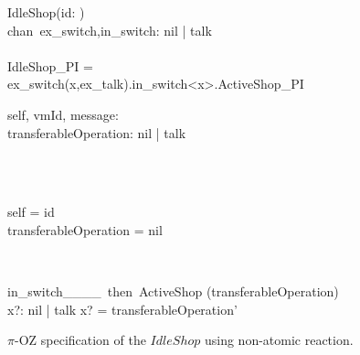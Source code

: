 \begin{figure}[H]
\centering
\begin{class}{IdleShop(id: \integer)}
\ 
\\chan\ ex\_switch,in\_switch: nil | talk
\ \\ \
\\IdleShop\_PI = 
\\ \qquad  ex\_switch(x,ex\_talk).in\_switch<x>.ActiveShop\_PI
\\
\begin{state}
self, vmId, message: \integer
\\transferableOperation: nil | talk
\end{state} 
\\
\begin{init}
\\self = id
\\transferableOperation = nil
\end{init} 
\\
\begin{op}{in\_switch\_\_\_\_\ then\ ActiveShop}
\Delta (transferableOperation)
\\x?: nil | talk
\ST
x? = transferableOperation'
\end{op}
\end{class}
\caption{$\pi$-OZ specification of the $IdleShop$ using non-atomic reaction.}
\label{comp_oz_pi_statefull_idleShop_non_atomic}
\end{figure}